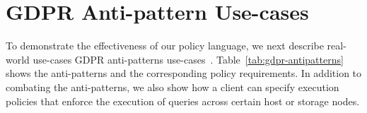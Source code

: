 


\section{GDPR Anti-pattern Use-cases}
To demonstrate the effectiveness of our policy language, we next describe real-world use-cases GDPR anti-patterns use-cases~\cite{shastrihotcloud2019, gdpr-antipattern-cacm}.  Table~\ref{tab:gdpr-antipatterns} shows the anti-patterns and the corresponding policy requirements. In addition to combating the anti-patterns, we also show how a client can specify execution policies that enforce the execution of queries across certain host or storage nodes.



